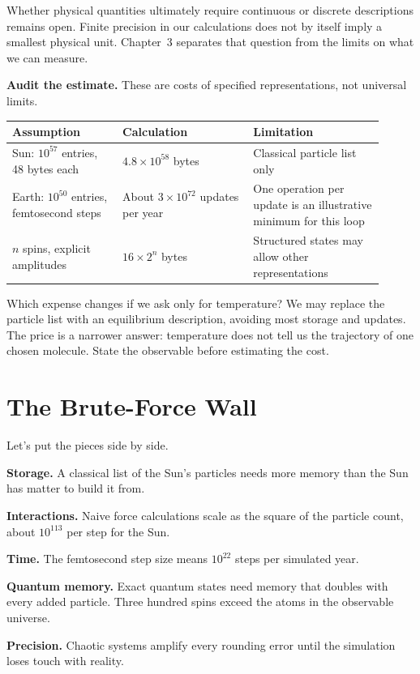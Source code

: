 Whether physical quantities ultimately require continuous or discrete descriptions remains open. Finite precision in our calculations does not by itself imply a smallest physical unit. Chapter~3 separates that question from the limits on what we can measure.

\begin{examplebox}
\textbf{Audit the estimate.} These are costs of specified representations, not universal limits.

\smallskip
\begin{tabular}{@{}L{0.27\linewidth}L{0.32\linewidth}L{0.32\linewidth}@{}}
\textbf{Assumption} & \textbf{Calculation} & \textbf{Limitation} \\
\hline
Sun: \(10^{57}\) entries, 48 bytes each & \(4.8\times10^{58}\) bytes & Classical particle list only \\
Earth: \(10^{50}\) entries, femtosecond steps & About \(3\times10^{72}\) updates per year & One operation per update is an illustrative minimum for this loop \\
\(n\) spins, explicit amplitudes & \(16\times2^n\) bytes & Structured states may allow other representations
\end{tabular}
\end{examplebox}

\begin{quickpracticebox}
Which expense changes if we ask only for temperature? We may replace the particle list with an equilibrium description, avoiding most storage and updates. The price is a narrower answer: temperature does not tell us the trajectory of one chosen molecule. State the observable before estimating the cost.
\end{quickpracticebox}

\section{The Brute-Force Wall}

Let's put the pieces side by side.

\begin{compactchecklist}
\item \textbf{Storage.} A classical list of the Sun's particles needs more memory than the Sun has matter to build it from.
\item \textbf{Interactions.} Naive force calculations scale as the square of the particle count, about \(10^{113}\) per step for the Sun.
\item \textbf{Time.} The femtosecond step size means \(10^{22}\) steps per simulated year.
\item \textbf{Quantum memory.} Exact quantum states need memory that doubles with every added particle. Three hundred spins exceed the atoms in the observable universe.
\item \textbf{Precision.} Chaotic systems amplify every rounding error until the simulation loses touch with reality.
\end{compactchecklist}

